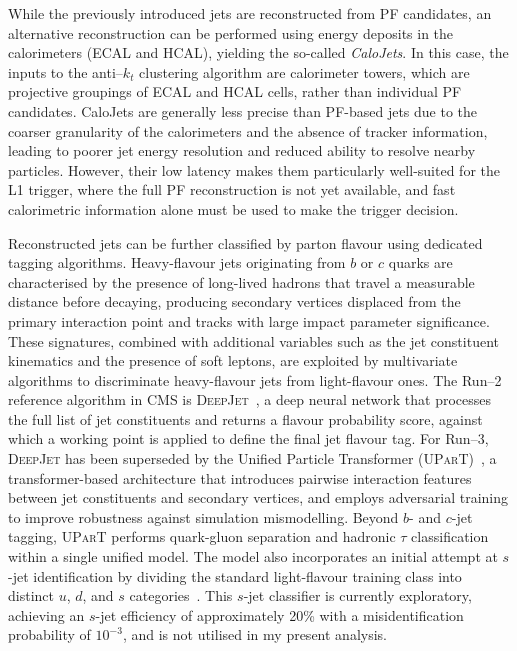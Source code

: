 \vspace{0.5 cm}

While the previously introduced jets are reconstructed from PF candidates, an alternative reconstruction can be performed using energy deposits in the calorimeters (ECAL and HCAL), yielding the so-called \textit{CaloJets}. In this case, the inputs to the anti--$k_t$ clustering algorithm are calorimeter towers, which are projective groupings of ECAL and HCAL cells, rather than individual PF candidates. CaloJets are generally less precise than PF-based jets due to the coarser granularity of the calorimeters and the absence of tracker information, leading to poorer jet energy resolution and reduced ability to resolve nearby particles. However, their low latency makes them particularly well-suited for the L1 trigger, where the full PF reconstruction is not yet available, and fast calorimetric information alone must be used to make the trigger decision.

\vspace{0.5 cm}

Reconstructed jets can be further classified by parton flavour using dedicated tagging algorithms. Heavy-flavour jets originating from $b$ or $c$ quarks are characterised by the presence of long-lived hadrons that travel a measurable distance before decaying, producing secondary vertices displaced from the primary interaction point and tracks with large impact parameter significance. These signatures, combined with additional variables such as the jet constituent kinematics and the presence of soft leptons, are exploited by multivariate algorithms to discriminate heavy-flavour jets from light-flavour ones. The Run--2 reference algorithm in CMS is \textsc{DeepJet}~\cite{DeepJet}, a deep neural network that processes the full list of jet constituents and returns a flavour probability score, against which a working point is applied to define the final jet flavour tag. For Run--3, \textsc{DeepJet} has been superseded by the Unified Particle Transformer (\textsc{UParT})~\cite{UParT}, a transformer-based architecture that introduces pairwise interaction features between jet constituents and secondary vertices, and employs adversarial training to improve robustness against simulation mismodelling. Beyond $b$- and $c$-jet tagging, \textsc{UParT} performs quark-gluon separation and hadronic $\tau$ classification within a single unified model. The model also incorporates an initial attempt at $s$-jet identification by dividing the standard light-flavour training class into distinct $u$, $d$, and $s$ categories~\cite{UParT}. This $s$-jet classifier is currently exploratory, achieving an $s$-jet efficiency of approximately 20\% with a misidentification probability of $10^{-3}$, and is not utilised in my present analysis.


